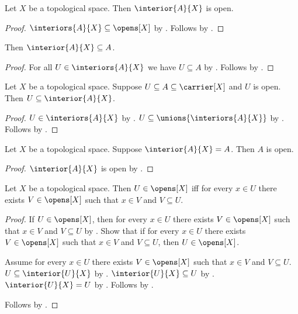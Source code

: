 \begin{proposition}\label{interior_is_open}
    Let $X$ be a topological space.
    Then $\interior{A}{X}$ is open.
\end{proposition}
\begin{proof}
    $\interiors{A}{X}\subseteq\opens[X]$ by .
    Follows by .
\end{proof}

\begin{proposition}\label{interior_subseteq}
    Then $\interior{A}{X}\subseteq A$.
\end{proposition}
\begin{proof}
    For all $U\in\interiors{A}{X}$ we have $U\subseteq A$
        by .
    Follows by .
\end{proof}

\begin{proposition}\label{interior_maximal}
    Let $X$ be a topological space.
    Suppose $U\subseteq A\subseteq \carrier[X]$ and $U$ is open.
    Then $U\subseteq \interior{A}{X}$.
\end{proposition}
\begin{proof}
    $U\in\interiors{A}{X}$ by .
    $U\subseteq\unions{\interiors{A}{X}}$ by .
    Follows by .
\end{proof}

\begin{proposition}\label{interior_eq_self_implies_open}
    Let $X$ be a topological space.
    Suppose $\interior{A}{X} = A$.
    Then $A$ is open.
\end{proposition}
\begin{proof}
    $\interior{A}{X}$ is open by .
\end{proof}

\begin{theorem}\label{open_iff_local_open_subsets}
    Let $X$ be a topological space.
    Then $U\in\opens[X]$ iff
        for every $x\in U$ there exists $V\in\opens[X]$ such that
            $x\in V$ and $V\subseteq U$.
\end{theorem}
\begin{proof}
    If $U\in\opens[X]$, then for every $x\in U$ there exists
        $V\in\opens[X]$ such that $x\in V$ and $V\subseteq U$ by
        .
    Show that if for every $x\in U$ there exists $V\in\opens[X]$ such that
        $x\in V$ and $V\subseteq U$, then $U\in\opens[X]$.
    \begin{subproof}
        Assume for every $x\in U$ there exists $V\in\opens[X]$ such that
            $x\in V$ and $V\subseteq U$.
        $U\subseteq\interior{U}{X}$ by .
        $\interior{U}{X}\subseteq U$ by .
        $\interior{U}{X}=U$ by .
        Follows by .
    \end{subproof}
    Follows by \auto.
\end{proof}

